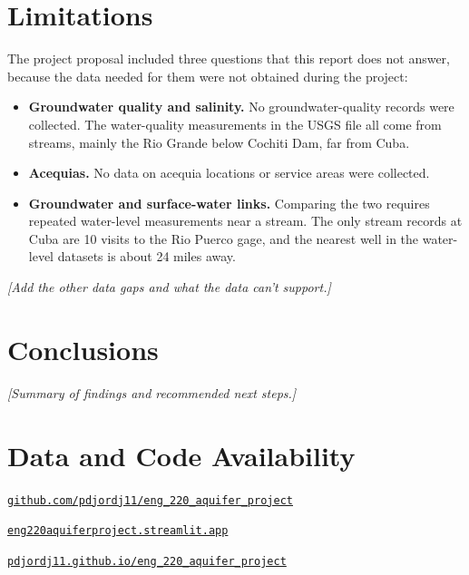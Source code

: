 \documentclass[10pt,twocolumn,letterpaper]{article}
\newif\ifdraftnotes \draftnotestrue   %
\newcommand{\draftnote}[1]{\ifdraftnotes{\color{draftorange}\itshape[#1]}\fi}
\begin{document}
\section{Limitations}\label{sec:limits}
The project proposal included three questions that this report does not answer, because the data
needed for them were not obtained during the project:
\begin{itemize}
  \item \textbf{Groundwater quality and salinity.} No groundwater-quality records were collected.
        The water-quality measurements in the USGS file all come from streams, mainly the Rio
        Grande below Cochiti Dam, far from Cuba.
  \item \textbf{Acequias.} No data on acequia locations or service areas were collected.
  \item \textbf{Groundwater and surface-water links.} Comparing the two requires repeated
        water-level measurements near a stream. The only stream records at Cuba are 10 visits to
        the Rio Puerco gage, and the nearest well in the water-level datasets is about 24 miles
        away.
\end{itemize}
\draftnote{Add the other data gaps and what the data can't support.}

\section{Conclusions}\label{sec:conclusions}
\draftnote{Summary of findings and recommended next steps.}

\section*{Data and Code Availability}
\begin{description}[style=nextline,leftmargin=1em,itemsep=1pt,font=\normalfont\bfseries]
  \item[Code and data] \href{https://github.com/pdjordj11/eng_220_aquifer_project}{\nolinkurl{github.com/pdjordj11/eng_220_aquifer_project}}
  \item[Interactive dashboard] \href{https://eng220aquiferproject.streamlit.app/}{\nolinkurl{eng220aquiferproject.streamlit.app}}
  \item[Documentation] \href{https://pdjordj11.github.io/eng_220_aquifer_project/}{\nolinkurl{pdjordj11.github.io/eng_220_aquifer_project}}
\end{description}
\end{document}
